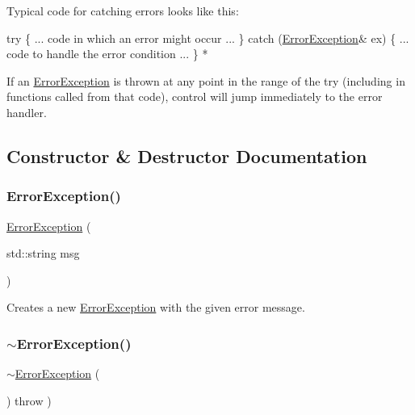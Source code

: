Typical code for catching errors looks like this\+:


\begin{DoxyPre}
     try \{
        ... code in which an error might occur ...
     \} catch (\mbox{\hyperlink{classErrorException}{ErrorException}}\& ex) \{
        ... code to handle the error condition ...
     \}
*\end{DoxyPre}


If an {\ttfamily \mbox{\hyperlink{classErrorException}{Error\+Exception}}} is thrown at any point in the range of the {\ttfamily try} (including in functions called from that code), control will jump immediately to the error handler. 

\subsection{Constructor \& Destructor Documentation}
\mbox{\label{classErrorException_a4f422b01fff7cc16eea81e00638f44d2}} 
\subsubsection{\texorpdfstring{Error\+Exception()}{ErrorException()}}
{\footnotesize\ttfamily \mbox{\hyperlink{classErrorException}{Error\+Exception}} (\begin{DoxyParamCaption}\item[{std\+::string}]{msg }\end{DoxyParamCaption})}



Creates a new \mbox{\hyperlink{classErrorException}{Error\+Exception}} with the given error message. 

\mbox{\label{classErrorException_a8a69609bdba32e156392e54dadadcb18}} 
\subsubsection{\texorpdfstring{$\sim$\+Error\+Exception()}{~ErrorException()}}
{\footnotesize\ttfamily $\sim$\mbox{\hyperlink{classErrorException}{Error\+Exception}} (\begin{DoxyParamCaption}{ }\end{DoxyParamCaption}) throw  ) \hspace{0.3cm}{\ttfamily [virtual]}}



